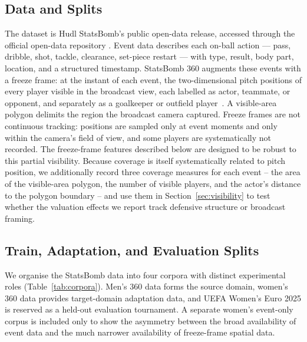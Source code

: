 \documentclass[runningheads]{llncs}
\begin{document}
\subsection{Data and Splits}

The dataset is Hudl StatsBomb's public open-data release, accessed through the official open-data repository \cite{statsbomb2026opendata}. Event data describes each on-ball action --- pass, dribble, shot, tackle, clearance, set-piece restart --- with type, result, body part, location, and a structured timestamp. StatsBomb 360 augments these events with a freeze frame: at the instant of each event, the two-dimensional pitch positions of every player visible in the broadcast view, each labelled as actor, teammate, or opponent, and separately as a goalkeeper or outfield player~\cite{statsbomb2021freezeframe}. A visible-area polygon delimits the region the broadcast camera captured. Freeze frames are not continuous tracking: positions are sampled only at event moments and only within the camera's field of view, and some players are systematically not recorded. The freeze-frame features described below are designed to be robust to this partial visibility. Because coverage is itself systematically related to pitch position, we additionally record three coverage measures for each event -- the area of the visible-area polygon, the number of visible players, and the actor's distance to the polygon boundary -- and use them in Section~\ref{sec:visibility} to test whether the valuation effects we report track defensive structure or broadcast framing.

\subsection{Train, Adaptation, and Evaluation Splits}
We organise the StatsBomb data into four corpora with distinct experimental roles (Table~\ref{tab:corpora}). Men's 360 data forms the source domain, women's 360 data provides target-domain adaptation data, and UEFA Women's Euro 2025 is reserved as a held-out evaluation tournament. A separate women's event-only corpus is included only to show the asymmetry between the broad availability of event data and the much narrower availability of freeze-frame spatial data.
\end{document}
